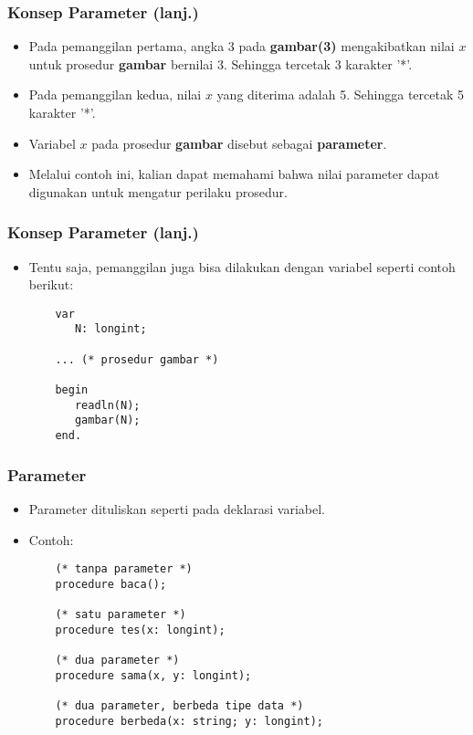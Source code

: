 \documentclass{beamer}
\begin{document}
\begin{frame}[fragile]
\frametitle{Konsep Parameter (lanj.)}
\begin{itemize}
    \item Pada pemanggilan pertama, angka 3 pada \textbf{gambar(3)} mengakibatkan nilai $x$ untuk prosedur \textbf{gambar} bernilai 3. Sehingga tercetak 3 karakter '*'.
    \item Pada pemanggilan kedua, nilai $x$ yang diterima adalah 5. Sehingga tercetak 5 karakter '*'.
    \item Variabel $x$ pada prosedur \textbf{gambar} disebut sebagai \alert{\textbf{parameter}}.
    \item Melalui contoh ini, kalian dapat memahami bahwa nilai parameter dapat digunakan untuk mengatur perilaku prosedur.
\end{itemize}
\end{frame}

\begin{frame}[fragile]
\frametitle{Konsep Parameter (lanj.)}
\begin{itemize}
    \item Tentu saja, pemanggilan juga bisa dilakukan dengan variabel seperti contoh berikut:
    \begin{lstlisting}
    var
       N: longint;

    ... (* prosedur gambar *)

    begin
       readln(N);
       gambar(N);
    end.
    \end{lstlisting}
\end{itemize}
\end{frame}

\begin{frame}[fragile]
\frametitle{Parameter}
\begin{itemize}
    \item Parameter dituliskan seperti pada deklarasi variabel.
    \item Contoh:
    \begin{lstlisting}
    (* tanpa parameter *)
    procedure baca();

    (* satu parameter *)
    procedure tes(x: longint);

    (* dua parameter *)
    procedure sama(x, y: longint);

    (* dua parameter, berbeda tipe data *)
    procedure berbeda(x: string; y: longint);
    \end{lstlisting}
\end{itemize}
\end{frame}
\end{document}
